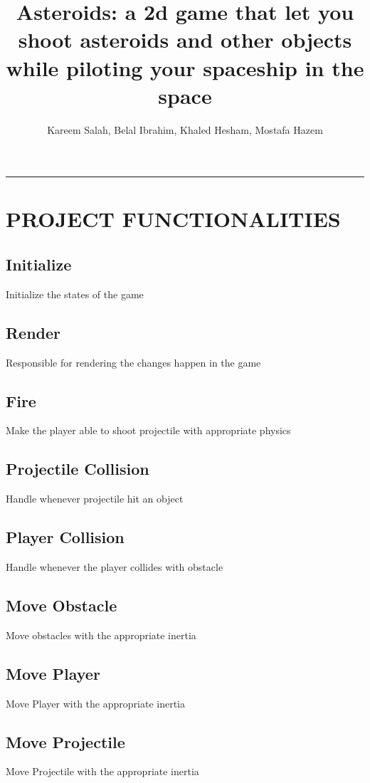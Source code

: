 \documentclass[]{article}
\title{Asteroids: a 2d game that let you shoot asteroids and other objects while piloting your spaceship in the space }
\author{Kareem Salah, Belal Ibrahim, Khaled Hesham, Mostafa Hazem}
\begin{document}
\maketitle
\noindent\rule{12cm}{0.5pt}

\section{PROJECT FUNCTIONALITIES}

\subsection{Initialize}
Initialize the states of the game

\subsection{Render}
Responsible for rendering the changes happen in the game

\subsection{Fire}
Make the player able to shoot projectile with appropriate physics

\subsection{Projectile Collision}
Handle whenever projectile hit an object

\subsection{Player Collision}
Handle whenever the player collides with obstacle

\subsection{Move Obstacle}
Move obstacles with the appropriate inertia

\subsection{Move Player}
Move Player with the appropriate inertia

\subsection{Move Projectile}
Move Projectile with the appropriate inertia
\end{document}

